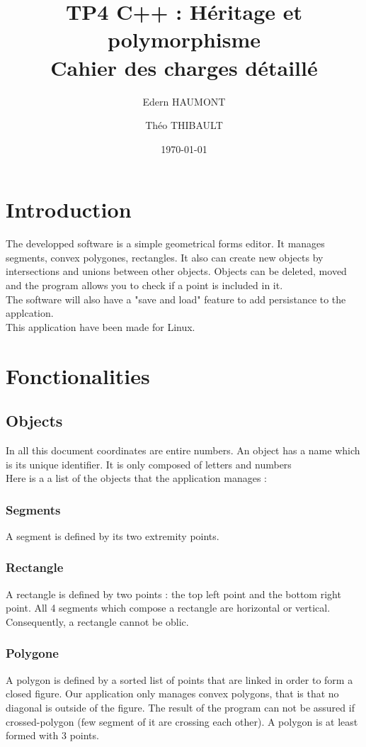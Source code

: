 \documentclass[a4paper, 12pts]{article}
\title{%
 TP4 C++ : Héritage et polymorphisme \\
 \large Cahier des charges détaillé}
\author{Edern HAUMONT}
\author{Théo THIBAULT}
\affil{B3133}
\date{\today}
\begin{document}

\maketitle



\section{Introduction}
	The developped software is a simple geometrical forms editor. It manages segments, convex polygones, rectangles.
	It also can create new objects by intersections and unions between other objects.
	Objects can be deleted, moved and the program allows you to check if a point is included in it.\\
	The software will also have a "save and load" feature to add persistance to the applcation.\\
	This application have been made for Linux.

\section{Fonctionalities}
	\subsection{Objects}
		In all this document coordinates are entire numbers.
		An object has a name which is its unique identifier. It is only composed of letters and numbers\\
		Here is a a list of the objects that the application manages :
		\subsubsection{Segments}
			A segment is defined by its two extremity points.
		\subsubsection{Rectangle}
			A rectangle is defined by two points : the top left point and the bottom right point.
			All 4 segments which compose a rectangle are horizontal or vertical. Consequently, a rectangle cannot be oblic.
		\subsubsection{Polygone}
			A polygon is defined by a sorted list of points that are linked in order to form a closed figure.
			Our application only manages convex polygons, that is that no diagonal is outside of the figure.
			The result of the program can not be assured if crossed-polygon (few segment of it are crossing each other).
			A polygon is at least formed with 3 points.
\end{document}
